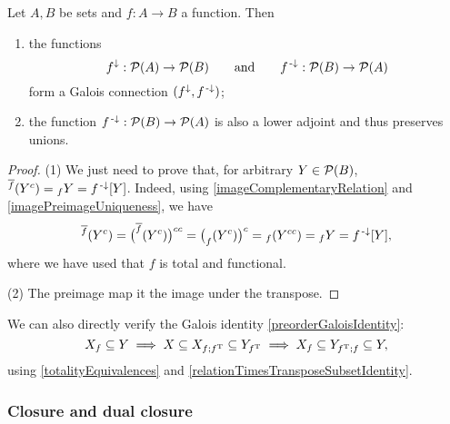 \begin{corollary} \label{functionImagePreimageGaloisConnection}
Let $A,B$ be sets and $f:A\to B$ a function. Then
\begin{enumerate}
\item the functions
\[ f^\downarrow: \operatorname{\mathcal{P}}(A)\to\operatorname{\mathcal{P}}(B) \qquad\text{and}\qquad f^{\text{\hspace{0.15em}-}\downarrow}: \operatorname{\mathcal{P}}(B)\to\operatorname{\mathcal{P}}(A) \]
form a Galois connection $(f^\downarrow, f^{\text{\hspace{0.15em}-}\downarrow})$;
\item the function $f^{\text{\hspace{0.15em}-}\downarrow}: \operatorname{\mathcal{P}}(B)\to\operatorname{\mathcal{P}}(A)$ is also a lower adjoint and thus preserves unions.
\end{enumerate}
\end{corollary}
\begin{proof}
(1) We just need to prove that, for arbitrary $Y\in \operatorname{\mathcal{P}}(B)$, ${^{\overline{f}}(Y^c)} = {_fY} = f^{\text{\hspace{0.15em}-}\downarrow}[Y]$. Indeed, using \ref{imageComplementaryRelation} and \ref{imagePreimageUniqueness}, we have
\[ {^{\overline{f}}(Y^c)} = \big(^{\overline{f}}(Y^c)\big)^{cc} = \big(_f(Y^c)\big)^c = {_f(Y^{cc})} = {_fY} = f^{\text{\hspace{0.15em}-}\downarrow}[Y], \]
where we have used that $f$ is total and functional.

(2) The preimage map it the image under the transpose.
\end{proof}
We can also directly verify the Galois identity \ref{preorderGaloisIdentity}:
\[ X_f \subseteq Y \implies X \subseteq X_{f;f^{\mathrm{T}}} \subseteq Y_{f^{\mathrm{T}}} \implies X_f \subseteq Y_{f^{\mathrm{T}};f} \subseteq Y, \]
using \ref{totalityEquivalences} and \ref{relationTimesTransposeSubsetIdentity}.

\subsubsection{Closure and dual closure}


